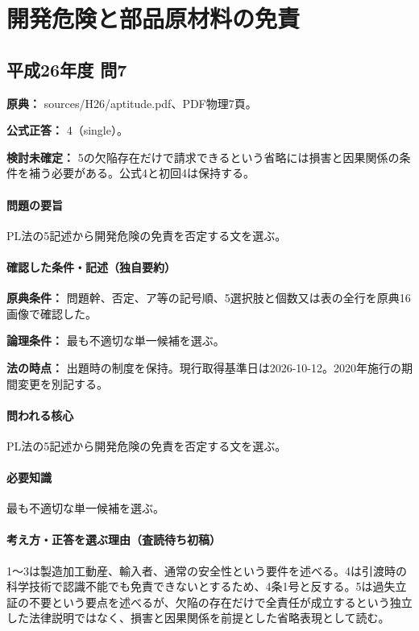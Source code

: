 \section{開発危険と部品原材料の免責}

\subsection{平成26年度 問7}
\label{q:h26-reg-apt-07}

\noindent\textbf{原典：} sources/H26/aptitude.pdf、PDF物理7頁。

\textbf{公式正答：} 4（single）。

\par\textbf{検討未確定：} 5の欠陥存在だけで請求できるという省略には損害と因果関係の条件を補う必要がある。公式4と初回4は保持する。

\paragraph{問題の要旨} PL法の5記述から開発危険の免責を否定する文を選ぶ。

\paragraph{確認した条件・記述（独自要約）}\mbox{}\par

\noindent\textbf{原典条件：} 問題幹、否定、ア等の記号順、5選択肢と個数又は表の全行を原典16画像で確認した。\par

\noindent\textbf{論理条件：} 最も不適切な単一候補を選ぶ。\par

\noindent\textbf{法の時点：} 出題時の制度を保持。現行取得基準日は2026-10-12。2020年施行の期間変更を別記する。\par

\paragraph{問われる核心} PL法の5記述から開発危険の免責を否定する文を選ぶ。

\paragraph{必要知識} 最も不適切な単一候補を選ぶ。

\paragraph{考え方・正答を選ぶ理由（査読待ち初稿）} 1〜3は製造加工動産、輸入者、通常の安全性という要件を述べる。4は引渡時の科学技術で認識不能でも免責できないとするため、4条1号と反する。5は過失立証の不要という要点を述べるが、欠陥の存在だけで全責任が成立するという独立した法律説明ではなく、損害と因果関係を前提とした省略表現として読む。

